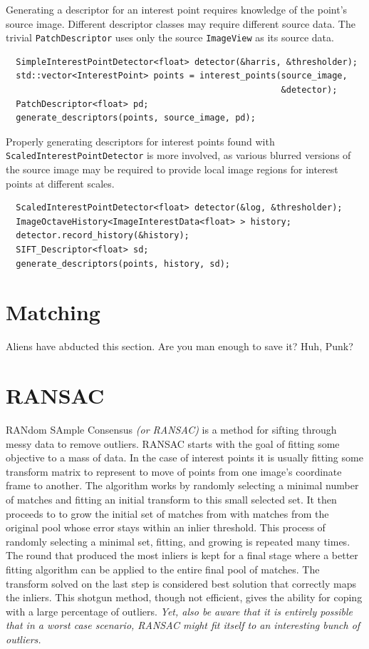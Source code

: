 Generating a descriptor for an interest point requires knowledge
of the point's source image. Different descriptor classes may
require different source data. The trivial {\tt PatchDescriptor}
uses only the source {\tt ImageView} as its source data.

\begin{verbatim}
  SimpleInterestPointDetector<float> detector(&harris, &thresholder);
  std::vector<InterestPoint> points = interest_points(source_image,
                                                      &detector);
  PatchDescriptor<float> pd;
  generate_descriptors(points, source_image, pd);
\end{verbatim}

Properly generating descriptors for interest points found with
{\tt ScaledInterestPointDetector} is more involved, as various
blurred versions of the source image may be required to provide
local image regions for interest points at different scales.

\begin{verbatim}
  ScaledInterestPointDetector<float> detector(&log, &thresholder);
  ImageOctaveHistory<ImageInterestData<float> > history;
  detector.record_history(&history);
  SIFT_Descriptor<float> sd;
  generate_descriptors(points, history, sd);
\end{verbatim}

\section{Matching}

Aliens have abducted this section. Are you man enough to save it? Huh,
Punk?

\section{RANSAC}

RANdom SAmple Consensus {\em (or RANSAC)} is a method for sifting through
messy data to remove outliers. RANSAC starts with the goal of fitting
some objective to a mass of data. In the case of interest points it is
usually fitting some transform matrix to represent to move of points
from one image's coordinate frame to another. The algorithm works by
randomly selecting a minimal number of matches and fitting an initial
transform to this small selected set. It then proceeds to to grow the
initial set of matches from with matches from the original pool whose
error stays within an inlier threshold. This process of randomly
selecting a minimal set, fitting, and growing is repeated many
times. The round that produced the most inliers is kept for a final
stage where a better fitting algorithm can be applied to the entire
final pool of matches. The transform solved on the last step is
considered best solution that correctly maps the inliers. This shotgun
method, though not efficient, gives the ability for coping with a
large percentage of outliers. {\em Yet, also be aware that it is entirely
possible that in a worst case scenario, RANSAC might fit itself to an
interesting bunch of outliers.}

